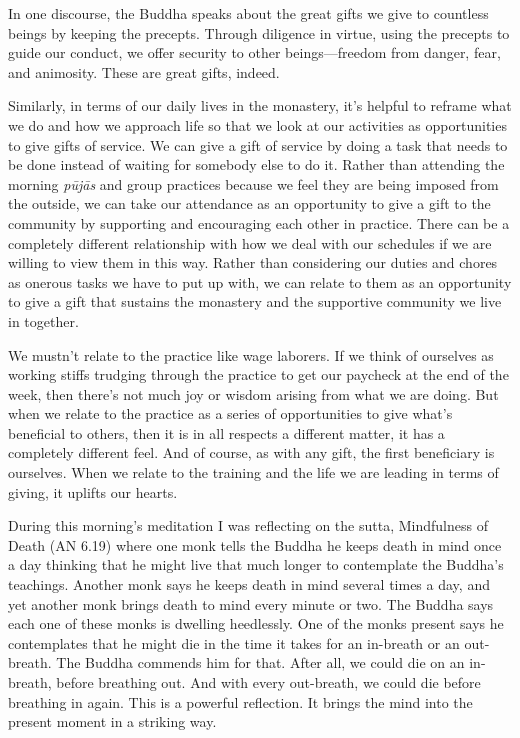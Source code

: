 
In one discourse, the Buddha speaks about the great gifts we give to 
countless beings by keeping the precepts. Through diligence in virtue, 
using the precepts to guide our conduct, we offer security to other 
beings---freedom from danger, fear, and animosity. These are great 
gifts, indeed.

Similarly, in terms of our daily lives in the monastery, it's helpful 
to reframe what we do and how we approach life so that we look at our 
activities as opportunities to give gifts of service. We can give a 
gift of service by doing a task that needs to be done instead of 
waiting for somebody else to do it. Rather than attending the morning 
\emph{pūjās} and group practices because we feel they are being 
imposed from the outside, we can take our attendance as an opportunity 
to give a gift to the community by supporting and encouraging each 
other in practice. There can be a completely different relationship 
with how we deal with our schedules if we are willing to view them in 
this way. Rather than considering our duties and chores as onerous 
tasks we have to put up with, we can relate to them as an opportunity 
to give a gift that sustains the monastery and the supportive community 
we live in together.

We mustn't relate to the practice like wage laborers. If we think of 
ourselves as working stiffs trudging through the practice to get our 
paycheck at the end of the week, then there's not much joy or wisdom 
arising from what we are doing. But when we relate to the practice as a 
series of opportunities to give what's beneficial to others, then it is 
in all respects a different matter, it has a completely different feel. 
And of course, as with any gift, the first beneficiary is ourselves. 
When we relate to the training and the life we are leading in terms of 
giving, it uplifts our hearts.


During this morning's meditation I was reflecting on the sutta, 
Mindfulness of Death (AN 6.19) where one monk tells the Buddha he keeps 
death in mind once a day thinking that he might live that much longer 
to contemplate the Buddha's teachings. Another monk says he keeps death 
in mind several times a day, and yet another monk brings death to mind 
every minute or two. The Buddha says each one of these monks is 
dwelling heedlessly. One of the monks present says he contemplates that 
he might die in the time it takes for an in-breath or an out-breath. 
The Buddha commends him for that. After all, we could die on an 
in-breath, before breathing out. And with every out-breath, we could 
die before breathing in again. This is a powerful reflection. It brings 
the mind into the present moment in a striking way.

